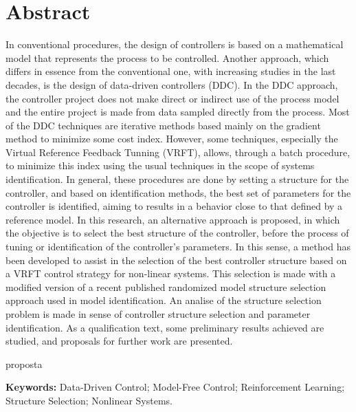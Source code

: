 
\chapter*{Abstract}

\vspace{-2cm}

In conventional procedures, the design of controllers is based on a mathematical model that represents the process to be controlled. Another approach, which differs in essence from the conventional one, with increasing studies in the last decades, is the design of data-driven controllers (DDC). In the DDC approach, the controller project does not make direct or indirect use of the process model and the entire project is made from data sampled directly from the process. Most of the DDC techniques are iterative methods based mainly on the gradient method to minimize some cost index. However, some techniques, especially the Virtual Reference Feedback Tunning (VRFT), allows, through a batch procedure, to minimize this index using the usual techniques in the scope of systems identification. In general, these procedures are done by setting a structure for the controller, and based on identification methods, the best set of parameters for the controller is identified, aiming to results in a behavior close to that defined by a reference model. In this research, an alternative approach is proposed, in which the objective is to select the best structure of the controller, before the process of tuning or identification of the controller's parameters. In this sense, a method has been developed to assist in the selection of the best controller structure based on a VRFT control strategy for non-linear systems. This selection is made with a modified version of a recent published randomized  model structure selection approach used in model identification. An analise of the structure selection problem is made in sense of controller structure selection and parameter identification. As a qualification text, some preliminary results achieved are studied, and proposals for further work are presented.


proposta

\textbf{Keywords:} Data-Driven Control; Model-Free Control; Reinforcement Learning; Structure Selection; Nonlinear Systems.

